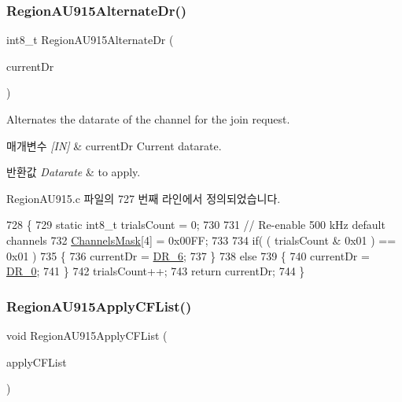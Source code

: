 \subsubsection{\texorpdfstring{Region\+A\+U915\+Alternate\+Dr()}{RegionAU915AlternateDr()}}
{\footnotesize\ttfamily int8\+\_\+t Region\+A\+U915\+Alternate\+Dr (\begin{DoxyParamCaption}\item[{int8\+\_\+t}]{current\+Dr }\end{DoxyParamCaption})}



Alternates the datarate of the channel for the join request. 


\begin{DoxyParams}{매개변수}
{\em \mbox{[}\+I\+N\mbox{]}} & current\+Dr Current datarate.\\
\hline
\end{DoxyParams}

\begin{DoxyRetVals}{반환값}
{\em Datarate} & to apply. \\
\hline
\end{DoxyRetVals}


Region\+A\+U915.\+c 파일의 727 번째 라인에서 정의되었습니다.


\begin{DoxyCode}
728 \{
729     \textcolor{keyword}{static} int8\_t trialsCount = 0;
730 
731     \textcolor{comment}{// Re-enable 500 kHz default channels}
732     \mbox{\hyperlink{_region_a_u915_8c_a2188957b5ca6af8092154d7ccbfa5757}{ChannelsMask}}[4] = 0x00FF;
733 
734     \textcolor{keywordflow}{if}( ( trialsCount & 0x01 ) == 0x01 )
735     \{
736         currentDr = \mbox{\hyperlink{group___r_e_g_i_o_n_ga8e2b4c15b7dbb8bda5ed635ca1d262be}{DR\_6}};
737     \}
738     \textcolor{keywordflow}{else}
739     \{
740         currentDr = \mbox{\hyperlink{group___r_e_g_i_o_n_ga6c4ef966b4f3d5eb7597b087f2b97095}{DR\_0}};
741     \}
742     trialsCount++;
743     \textcolor{keywordflow}{return} currentDr;
744 \}
\end{DoxyCode}
\mbox{\label{group___r_e_g_i_o_n_a_u915_ga4fd62616137cb73c9fc38f0854e6dad9}} 
\subsubsection{\texorpdfstring{Region\+A\+U915\+Apply\+C\+F\+List()}{RegionAU915ApplyCFList()}}
{\footnotesize\ttfamily void Region\+A\+U915\+Apply\+C\+F\+List (\begin{DoxyParamCaption}\item[{\mbox{\hyperlink{group___r_e_g_i_o_n_ga71588e9ad07e34b78fa91d51881fd3c6}{Apply\+C\+F\+List\+Params\+\_\+t}} $\ast$}]{apply\+C\+F\+List }\end{DoxyParamCaption})}



